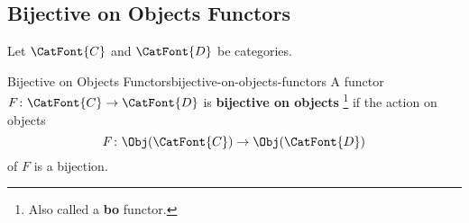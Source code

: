 \subsection{Bijective on Objects Functors}\label{subsection-bijective-on-objects-functors}
Let $\CatFont{C}$ and $\CatFont{D}$ be categories.
\begin{definition}{Bijective on Objects Functors}{bijective-on-objects-functors}%
    A functor $F\colon\CatFont{C}\to\CatFont{D}$ is \textbf{bijective on objects}%
    \footnote{%
        Also called a \textbf{bo} functor.
        \par\vspace*{-1.75\baselineskip}
    } %
    if the action on objects
    \[
        F%
        \colon%
        \Obj(\CatFont{C})%
        \to%
        \Obj(\CatFont{D})%
    \]%
    of $F$ is a bijection.
\end{definition}
